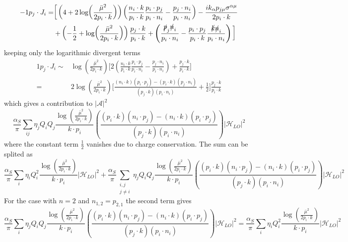 \documentclass{article}
\newcommand{\s}[1]{\slashed #1}
\begin{document}
\begin{alignat*}{-1}
	p_j\cdot J_i= &\bigg[
	\left(4+2\log(\frac{\bar{\mu}^2}{2p_i\cdot k})\right)\left(\frac{n_i\cdot k}{p_i\cdot k}\frac{p_i\cdot p_j}{p_i\cdot n_i}-\frac{p_j \cdot n_i}{p_i\cdot n_i}\right)
	- \frac{ik_\alpha p_{j\mu} \sigma^{\alpha\mu}}{2p_i\cdot k}\\&
	+ \left(-\frac{1}{2}+\log(\frac{\bar{\mu}^2}{2p_i\cdot k})\right)\frac{p_j \cdot k}{p_i\cdot k}
	+ \left(\frac{\s{p}_j \s{n}_i}{p_i\cdot n_i}-\frac{p_i\cdot p_j}{p_i\cdot k}\frac{\s{k}\s{n}_i}{p_i\cdot n_i}\right)\bigg]
\end{alignat*}
keeping only the logarithmic divergent terms
\begin{alignat}{1}
	p_j\cdot J_i \sim &\log(\frac{\bar{\mu}^2}{2p_i\cdot k})\bigg[
	2\left(\frac{n_i\cdot k}{p_i\cdot k}\frac{p_i\cdot p_j}{p_i\cdot n_i}-\frac{p_j \cdot n_i}{p_i\cdot n_i}\right)
	+\frac{p_j \cdot k}{p_i\cdot k}\bigg]\\
	= &2\log(\frac{\bar{\mu}^2}{2p_i\cdot k})\bigg[
	\frac{(n_i\cdot k)(p_i\cdot p_j)-(p_i\cdot k)(p_j \cdot n_i)}{(p_j\cdot k)(p_i\cdot n_i)}+\frac{1}{2}\bigg]\frac{p_j \cdot k}{p_i\cdot k}
\end{alignat}
which gives a contribution to $|\mathcal{A}|^2$
\begin{equation}
	\frac{\alpha_S}{\pi}\sum_{ij}\eta_j Q_i Q_j\frac{\log(\frac{\bar{\mu}^2}{2p_i\cdot k})}{k\cdot p_i}
	\left(\frac{(p_i\cdot k)(n_i\cdot p_j)-(n_i\cdot k)(p_i\cdot p_j)}{(p_j\cdot k)(p_i\cdot n_i)}\right)|\mathcal{H}_{LO}|^2
\end{equation}
where the constant term $\frac{1}{2}$ vanishes due to charge conservation. The sum can be splited as
\begin{equation*}
	\frac{\alpha_S}{\pi}\sum_{i}\eta_i Q_i^2\frac{\log(\frac{\bar{\mu}^2}{2p_i\cdot k})}{k\cdot p_i}
	|\mathcal{H}_{LO}|^2
	+ \frac{\alpha_S}{\pi}\sum_{\substack{i,j\\j\neq i}}\eta_j Q_i Q_j\frac{\log(\frac{\bar{\mu}^2}{2p_i\cdot k})}{k\cdot p_i}
	\left(\frac{(p_i\cdot k)(n_i\cdot p_j)-(n_i\cdot k)(p_i\cdot p_j)}{(p_j\cdot k)(p_i\cdot n_i)}\right)|\mathcal{H}_{LO}|^2
\end{equation*}
For the case with $n=2$ and $n_{1,2}=p_{2,1}$ the second term gives
\begin{equation*}
	\frac{\alpha_S}{\pi}\sum_{i}\eta_j Q_i Q_j\frac{\log(\frac{\bar{\mu}^2}{2p_i\cdot k})}{k\cdot p_i}
	\left(\frac{(p_i\cdot k)(n_i\cdot p_j)-(n_i\cdot k)(p_i\cdot p_j)}{(p_j\cdot k)(p_i\cdot n_i)}\right)|\mathcal{H}_{LO}|^2
	=\frac{\alpha_S}{\pi}\sum_{i}\eta_i Q_i^2\frac{\log(\frac{\bar{\mu}^2}{2p_i\cdot k})}{k\cdot p_i}
	|\mathcal{H}_{LO}|^2
\end{equation*}
\end{document}
